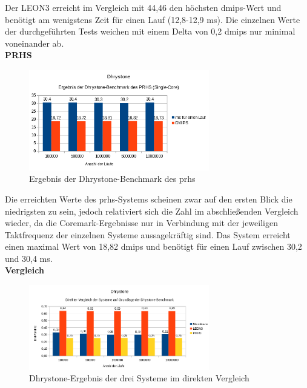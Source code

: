 Der LEON3 erreicht im Vergleich mit 44,46 den höchsten \ac{dmips}-Wert und benötigt am wenigstens Zeit für einen Lauf (12,8-12,9 ms). Die einzelnen Werte der durchgeführten Tests weichen mit
einem Delta von 0,2 \ac{dmips} nur minimal voneinander ab.\\

\textbf{PRHS}

\begin{figure}[H]
\centering
\includegraphics[width=0.7\textwidth]{Hauptteil/dhrystonesingleprhs.png}
\caption{Ergebnis der Dhrystone-Benchmark des \ac{prhs}}
\label{fig:dhrystonesingleprhs}
\end{figure}

Die erreichten Werte des \ac{prhs}-Systems scheinen zwar auf den ersten Blick die niedrigsten zu sein, jedoch relativiert sich die Zahl im abschließenden Vergleich wieder, da die
Coremark-Ergebnisse nur in Verbindung mit der jeweiligen Taktfrequenz der einzelnen Systeme aussagekräftig sind. Das System erreicht einen maximal Wert von
18,82 \ac{dmips} und benötigt für einen Lauf zwischen 30,2 und 30,4 ms.\\

\textbf{Vergleich}


\begin{figure}[H]
\centering
\includegraphics[width=0.7\textwidth]{Hauptteil/dhrystoneresult.png}
\caption{Dhrystone-Ergebnis der drei Systeme im direkten Vergleich}
\label{fig:dhrystoneresult}
\end{figure}

